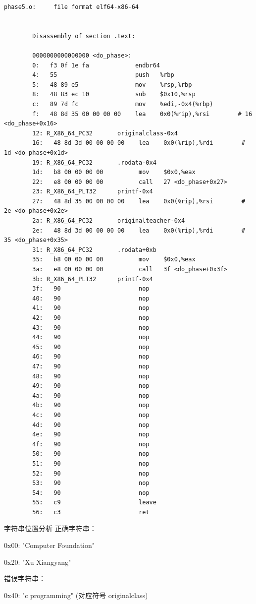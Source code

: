 \documentclass[supercite]{Experimental_Report}
\theoremstyle{definition}
\begin{document}
	\begin{lstlisting}[style=commonCodeStyle, caption={phase5}, label={lst:5-3}]
		phase5.o:     file format elf64-x86-64
		
		
		Disassembly of section .text:
		
		0000000000000000 <do_phase>:
		0:   f3 0f 1e fa             endbr64
		4:   55                      push   %rbp
		5:   48 89 e5                mov    %rsp,%rbp
		8:   48 83 ec 10             sub    $0x10,%rsp
		c:   89 7d fc                mov    %edi,-0x4(%rbp)
		f:   48 8d 35 00 00 00 00    lea    0x0(%rip),%rsi        # 16 <do_phase+0x16>
		12: R_X86_64_PC32       originalclass-0x4
		16:   48 8d 3d 00 00 00 00    lea    0x0(%rip),%rdi        # 1d <do_phase+0x1d>
		19: R_X86_64_PC32       .rodata-0x4
		1d:   b8 00 00 00 00          mov    $0x0,%eax
		22:   e8 00 00 00 00          call   27 <do_phase+0x27>
		23: R_X86_64_PLT32      printf-0x4
		27:   48 8d 35 00 00 00 00    lea    0x0(%rip),%rsi        # 2e <do_phase+0x2e>
		2a: R_X86_64_PC32       originalteacher-0x4
		2e:   48 8d 3d 00 00 00 00    lea    0x0(%rip),%rdi        # 35 <do_phase+0x35>
		31: R_X86_64_PC32       .rodata+0xb
		35:   b8 00 00 00 00          mov    $0x0,%eax
		3a:   e8 00 00 00 00          call   3f <do_phase+0x3f>
		3b: R_X86_64_PLT32      printf-0x4
		3f:   90                      nop
		40:   90                      nop
		41:   90                      nop
		42:   90                      nop
		43:   90                      nop
		44:   90                      nop
		45:   90                      nop
		46:   90                      nop
		47:   90                      nop
		48:   90                      nop
		49:   90                      nop
		4a:   90                      nop
		4b:   90                      nop
		4c:   90                      nop
		4d:   90                      nop
		4e:   90                      nop
		4f:   90                      nop
		50:   90                      nop
		51:   90                      nop
		52:   90                      nop
		53:   90                      nop
		54:   90                      nop
		55:   c9                      leave
		56:   c3                      ret
	\end{lstlisting}
	字符串位置分析
	正确字符串：
	
	0x00: "Computer Foundation"
	
	0x20: "Xu Xiangyang"
	
	错误字符串：
	
	0x40: "c programming" (对应符号 originalclass)
	
\end{document}
